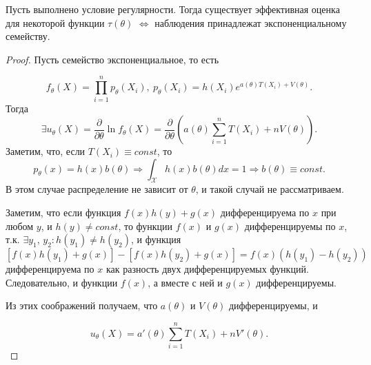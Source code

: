 \begin{proposition}
    Пусть выполнено условие регулярности. Тогда существует эффективная оценка для некоторой функции $\displaystyle \tau ( \theta )$ $\displaystyle \Leftrightarrow $ наблюдения принадлежат экспоненциальному семейству.
    \end{proposition}
    \begin{proof}
    Пусть семейство экспоненциальное, то есть
    
    
    \begin{equation*}
    f_{\theta }( X) =\prod _{i=1}^{n} p_{\theta }( X_{i}) ,\ p_{\theta }( X_{i}) =h( X_{i}) e^{a( \theta ) T( X_{i}) +V( \theta )} .
    \end{equation*}
    Тогда 
    \begin{equation*}
    \exists u_{\theta }( X) =\frac{\partial }{\partial \theta }\ln f_{\theta }( X) =\frac{\partial }{\partial \theta }\left( a( \theta )\sum _{i=1}^{n} T( X_{i}) +nV( \theta )\right) .
    \end{equation*}
    Заметим, что, если $\displaystyle T( X_{i}) \equiv const$, то
    \begin{equation*}
    p_{\theta }( x) =h( x) b( \theta ) \Rightarrow \int _{\mathcal{X}} h( x) b( \theta ) dx=1\Rightarrow b( \theta ) \equiv const.
    \end{equation*}
    В этом случае распределение не зависит от $\displaystyle \theta $, и такой случай не рассматриваем.
    
    Заметим, что если функция $\displaystyle f( x) h( y) +g( x)$ дифференцируема по $\displaystyle x$ при любом $\displaystyle y$, и $\displaystyle h( y) \ne const$, то функции $\displaystyle f( x)$ и $\displaystyle g( x)$ дифференцируемы по $\displaystyle x$, т.к. $\displaystyle \exists y_{1},\, y_{2} :h( y_{1}) \ne h( y_{2})$, и функция $\displaystyle [ f( x) h( y_{1}) +g( x)] -[ f( x) h( y_{2}) +g( x)] =f( x)( h( y_{1}) -h( y_{2}))$ дифференцируема по $\displaystyle x$ как разность двух дифференцируемых функций. Следовательно, и функции $\displaystyle f( x)$, а вместе с ней и $\displaystyle g( x)$ дифференцируемы.
    
    Из этих соображений получаем, что $\displaystyle a( \theta )$ и $\displaystyle V( \theta )$ дифференцируемы, и
    
    
    \begin{equation*}
    u_{\theta }( X) =a'( \theta )\sum _{i=1}^{n} T( X_{i}) +nV'( \theta ) .
    \end{equation*}
    

\end{proof}

